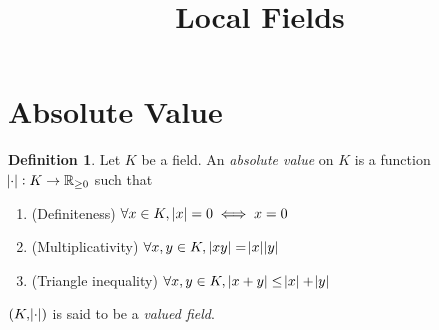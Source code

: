\documentclass[12pt]{amsart}
\title{Local Fields}
\theoremstyle{definition}
\newtheorem{definition}{Definition}[section]
\theoremstyle{plain}
\theoremstyle{remark}
\newcommand{\bR}{\mathbb{R}}
\begin{document}
\maketitle

\section{Absolute Value}

\let\svthefootnote\thefootnote
\let\thefootnote\relax{}
\let\thefootnote\svthefootnote

\begin{definition}
    Let $K$ be a field. An \emph{absolute value} on $K$ is a function $\abs{\cdot} : K \to \bR_{\ge 0}$ such that
    \begin{enumerate}
        \item (Definiteness) $\forall x \in K,\, \abs{x} = 0 \iff x = 0$
        \item (Multiplicativity) $\forall x, y \in K,\, \abs{x y} = \abs{x} \abs{y}$
        \item (Triangle inequality) $\forall x, y \in K,\, \abs{x + y} \le \abs{x} + \abs{y}$
    \end{enumerate}
    $(K, \abs{\cdot})$ is said to be a \emph{valued field}.
\end{definition}
\end{document}
